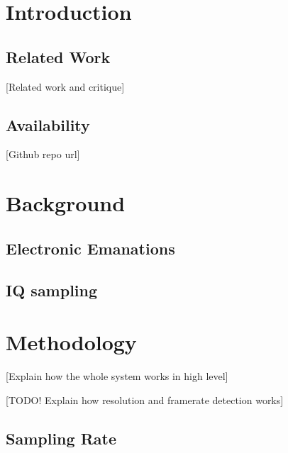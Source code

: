 \documentclass[a4paper,12pt,twoside,openright]{report}
\begin{document}
\pagestyle{empty}
\singlespacing

\onehalfspacing

\singlespacing


\setcounter{page}{0}
\pagestyle{plain}
\tableofcontents

\onehalfspacing


\chapter{Introduction}
\setcounter{page}{1} 

\section{Related Work} 

[Related work and critique]

\section{Availability} 
[Github repo url]

\cite{kuhn2003compromising}

\chapter{Background}

\section{Electronic Emanations} 

\section{IQ sampling} 

\chapter{Methodology} 

[Explain how the whole system works in high level]

[TODO! Explain how resolution and framerate detection works]



\section{Sampling Rate}
\end{document}
